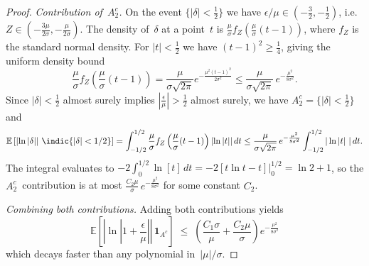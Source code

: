 \documentclass[12pt,onecolumn, margin=1in]{IEEEtran}
\newcommand{\bracket}[1]{\left[ #1 \right]}
\newcommand{\paren}[1]{\left( #1 \right)}
\newcommand{\abs}[1]{\left| #1 \right|}
\newcommand{\E}[1]{\mathbb{E}\left[ #1 \right]}
\begin{document}
\begin{proof}
\medskip
\noindent\textit{Contribution of~$A_2^c$.}\enspace
On the event $\{|\delta|<\frac{1}{2}\}$ we have
$\epsilon/\mu \in (-\frac{3}{2},-\frac{1}{2})$,
i.e.\ $Z \in (-\frac{3\mu}{2\sigma},-\frac{\mu}{2\sigma})$.
The density of~$\delta$ at a point~$t$ is
$\frac{\mu}{\sigma}f_Z\paren{\frac{\mu}{\sigma}(t-1)}$,
where $f_Z$ is the standard normal density.
For $\abs{t}<\frac{1}{2}$ we have $(t-1)^2 \ge \frac{1}{4}$, giving the
uniform density bound
\begin{equation}
  \frac{\mu}{\sigma}f_Z\paren{\frac{\mu}{\sigma}(t-1)}
  = \frac{\mu}{\sigma\sqrt{2\pi}}e^{-\frac{\mu^2(t-1)^2}{2\sigma^2}}
  \leq \frac{\mu}{\sigma\sqrt{2\pi}}\,e^{-\frac{\mu^2}{8\sigma^2}}.
\end{equation}
Since $\abs{\delta} < \frac{1}{2}$ almost surely implies $\abs{\frac{\epsilon}{\mu}}>\frac{1}{2}$ almost surely, we have $A_2^c = \{\abs{\delta} < \frac{1}{2}\}$ and
\begin{equation}
  \E{\abs{\ln\abs{\delta}}\,\indic{|\delta|<1/2}}
  = \int_{-1/2}^{1/2}\frac{\mu}{\sigma}f_Z\paren{\frac{\mu}{\sigma}(t-1)}\abs{\ln\abs{t}}dt
  \leq
  \frac{\mu}{\sigma\sqrt{2\pi}}\,e^{-\frac{\mu^2}{8\sigma^2}}
  \int_{-1/2}^{1/2} |\ln\abs{t}\,|\,dt.
\end{equation}
The integral evaluates to
$-2\int_0^{1/2}\ln\bracket{t}\,dt = -2\bracket{t\ln t -t}\Bigr|_0^{1/2}
= \ln 2 + 1$,
so the $A_2^c$~contribution is at most
$\frac{C_2\mu}{\sigma}\,e^{-\frac{\mu^2}{8\sigma^2}}$ for some constant $C_2$.

\medskip
\noindent\textit{Combining both contributions.}\enspace
Adding both contributions yields
\begin{equation}
  \E{\abs{\ln\abs{1+\frac{\epsilon}{\mu}}}\,\mathbf{1}_{A^c}}
  \;\le\; \paren{\frac{C_1\sigma}{\mu} + \frac{C_2\mu}{\sigma}} e^{-\frac{\mu^2}{8\sigma^2}}
\end{equation}
which decays faster than any polynomial in~$|\mu|/\sigma$.
\end{proof}
\end{document}
